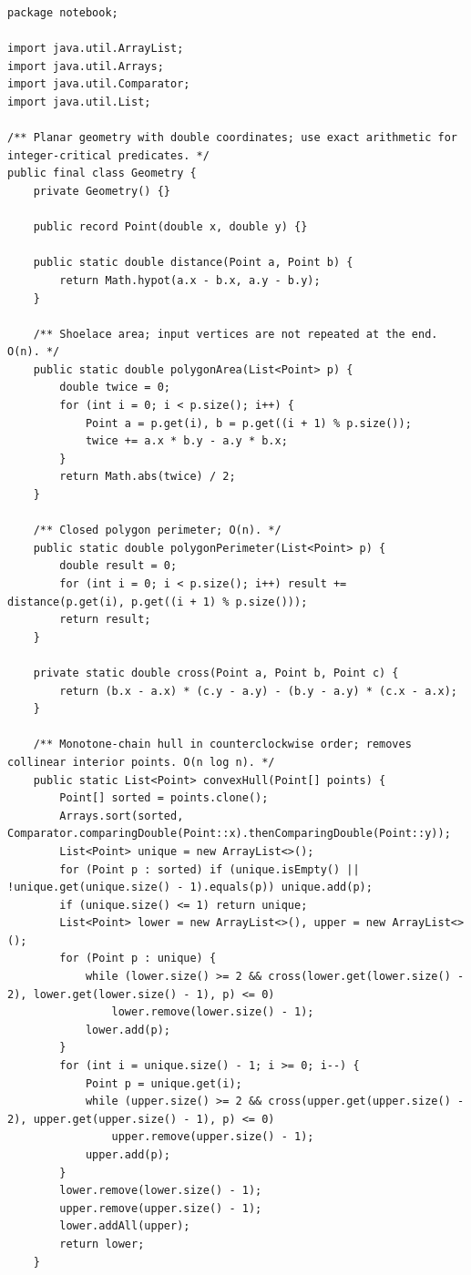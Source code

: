 \documentclass[10pt,letterpaper]{article}
\begin{document}
\begin{lstlisting}
package notebook;

import java.util.ArrayList;
import java.util.Arrays;
import java.util.Comparator;
import java.util.List;

/** Planar geometry with double coordinates; use exact arithmetic for integer-critical predicates. */
public final class Geometry {
    private Geometry() {}

    public record Point(double x, double y) {}

    public static double distance(Point a, Point b) {
        return Math.hypot(a.x - b.x, a.y - b.y);
    }

    /** Shoelace area; input vertices are not repeated at the end. O(n). */
    public static double polygonArea(List<Point> p) {
        double twice = 0;
        for (int i = 0; i < p.size(); i++) {
            Point a = p.get(i), b = p.get((i + 1) % p.size());
            twice += a.x * b.y - a.y * b.x;
        }
        return Math.abs(twice) / 2;
    }

    /** Closed polygon perimeter; O(n). */
    public static double polygonPerimeter(List<Point> p) {
        double result = 0;
        for (int i = 0; i < p.size(); i++) result += distance(p.get(i), p.get((i + 1) % p.size()));
        return result;
    }

    private static double cross(Point a, Point b, Point c) {
        return (b.x - a.x) * (c.y - a.y) - (b.y - a.y) * (c.x - a.x);
    }

    /** Monotone-chain hull in counterclockwise order; removes collinear interior points. O(n log n). */
    public static List<Point> convexHull(Point[] points) {
        Point[] sorted = points.clone();
        Arrays.sort(sorted, Comparator.comparingDouble(Point::x).thenComparingDouble(Point::y));
        List<Point> unique = new ArrayList<>();
        for (Point p : sorted) if (unique.isEmpty() || !unique.get(unique.size() - 1).equals(p)) unique.add(p);
        if (unique.size() <= 1) return unique;
        List<Point> lower = new ArrayList<>(), upper = new ArrayList<>();
        for (Point p : unique) {
            while (lower.size() >= 2 && cross(lower.get(lower.size() - 2), lower.get(lower.size() - 1), p) <= 0)
                lower.remove(lower.size() - 1);
            lower.add(p);
        }
        for (int i = unique.size() - 1; i >= 0; i--) {
            Point p = unique.get(i);
            while (upper.size() >= 2 && cross(upper.get(upper.size() - 2), upper.get(upper.size() - 1), p) <= 0)
                upper.remove(upper.size() - 1);
            upper.add(p);
        }
        lower.remove(lower.size() - 1);
        upper.remove(upper.size() - 1);
        lower.addAll(upper);
        return lower;
    }


\end{lstlisting}
\end{document}
